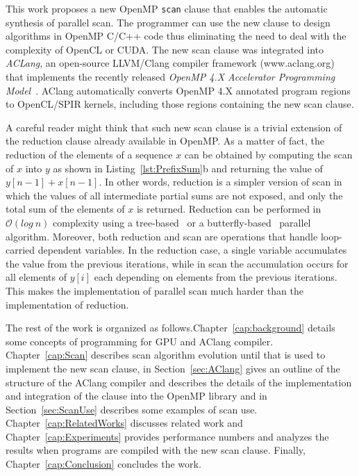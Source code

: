 \documentclass[Ingles]{ic-tese-v1}
\newcommand{\rcap}[1]{Chapter~\ref{cap:#1}}
\newcommand{\rsec}[1]{Section~\ref{sec:#1}}
\newcommand{\rlsts}[2]{Listing~\ref{lst:#1}{#2}}
\begin{document}
This work proposes a new OpenMP \texttt{scan} clause that enables the
automatic synthesis of parallel  scan.  The programmer can
use the new  clause to  design algorithms in OpenMP C/C++ code
thus eliminating the need to deal with  the complexity of OpenCL or CUDA.
The  new   scan  clause   was  integrated  into   \textit{ACLang},  an
open-source LLVM/Clang compiler framework (www.aclang.org) that
implements  the  recently   released  \textit{OpenMP  4.X  Accelerator
	Programming   Model}~\cite{MPereira2017}.     AClang   automatically
converts OpenMP 4.X annotated program regions to OpenCL/SPIR kernels,
including those regions containing the new scan clause.


A careful  reader might think that  such new scan clause  is a trivial
extension of the  reduction clause already available in  OpenMP.  As a
matter of fact, the reduction of the elements of a sequence $x$ can be
obtained  by  computing  the  scan  of   $x$  into  $y$  as  shown  in
\rlsts{PrefixSum}{b} and returning the value of $y[n-1] + x[n-1]$.  In
other  words, reduction  is a  simpler version  of scan  in which  the
values of all intermediate partial sums  are not exposed, and only the
total  sum of  the  elements of  $x$ is  returned.   Reduction can  be
performed    in    $\mathcal{O}(log\    n)$   complexity    using    a
tree-based~\cite{tree-based}                    or                   a
butterfly-based~\cite{butterfly-based} parallel  algorithm.  Moreover,
both  reduction  and  scan  are operations  that  handle  loop-carried
dependent  variables.   In  the  reduction  case,  a  single  variable
accumulates the value from the  previous iterations, while in scan the
accumulation  occurs for  all  elements of  $y[i]$  each depending  on
elements from the previous  iterations.  This makes the implementation
of parallel scan much harder than the implementation of reduction.

The rest of the work is organized as follows.\rcap{background} details
some concepts of programming for GPU and AClang compiler. \rcap{Scan}
describes scan algorithm evolution until that is used to implement the
new scan clause, in \rsec{AClang} gives an outline  of the structure of
the AClang compiler  and   describes  the  details  of   the  implementation
and integration     of    the     clause    into     the    OpenMP
library and in \rsec{ScanUse} describes some examples of scan use.
\rcap{RelatedWorks} discusses related work and
\rcap{Experiments} provides  performance numbers and analyzes
the results  when programs  are compiled with  the new scan clause.
Finally, \rcap{Conclusion} concludes the work.
\end{document}
